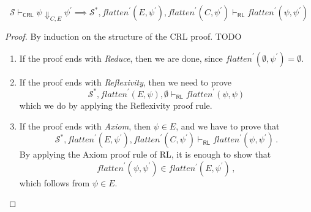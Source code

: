 \documentclass{article}
\newcommand{\RL}{\mathsf{RL}}
\newcommand{\CRL}{\mathsf{CRL}}
\begin{document}
\begin{lemma}
    \begin{equation*}
        \mathcal{S} \vdash_\CRL \psi \Downarrow_{C,E} \psi^\prime
        \implies
        \mathcal{S}^*, \mathit{flatten}^\prime(E, \psi^\prime), \mathit{flatten}^\prime(C, \psi^\prime) \vdash_\RL
          \mathit{flatten}^\prime(\psi, \psi^\prime) 
    \end{equation*}
\end{lemma}
\begin{proof}
By induction on the structure of the CRL proof. TODO
\begin{enumerate}
    \item If the proof ends with \emph{Reduce}, then we are done, since $\mathit{flatten}^\prime(\emptyset, \psi^\prime) = \emptyset$.
    
    \item If the proof ends with \emph{Reflexivity}, then we need to prove
    \begin{equation*}
        \mathcal{S}^*, \mathit{flatten}^\prime(E, \psi), \emptyset \vdash_\RL
          \mathit{flatten}^\prime(\psi, \psi) 
    \end{equation*}
    which we do by applying the Reflexivity proof rule.
    
    \item If the proof ends with \emph{Axiom}, then $\psi \in E$,
          and we have to prove that
          \begin{equation*}
            \mathcal{S}^*, \mathit{flatten}^\prime(E, \psi^\prime), \mathit{flatten}^\prime(C, \psi^\prime) \vdash_\RL
            \mathit{flatten}^\prime(\psi, \psi^\prime)               \, .
          \end{equation*}
          By applying the Axiom proof rule of RL, it is enough to show that
          \begin{equation*}
              \mathit{flatten}^\prime(\psi, \psi^\prime) \in \mathit{flatten^\prime}(E, \psi^\prime) \, ,
          \end{equation*}
          which follows from $\psi \in E$.
          

\end{enumerate}
\end{proof}
\end{document}
